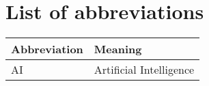 \section*{List of abbreviations}


\begin{table}[h!]
    \begin{center}
        \begin{tabularx}{\textwidth}{|l|X|}
            \hline
            \textbf{Abbreviation} & \textbf{Meaning} \\
            \hline
            AI & Artificial Intelligence \\
            \hline
        \end{tabularx}
    \end{center}
\end{table}